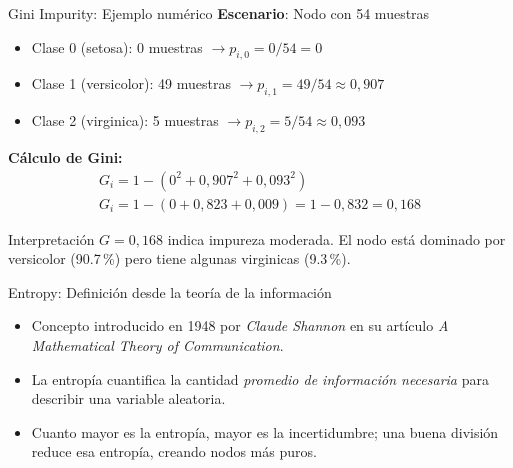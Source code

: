 \documentclass[aspectratio=169,12pt]{beamer}
\begin{document}
\begin{frame}{Gini Impurity: Ejemplo numérico}
  \textbf{Escenario}: Nodo con 54 muestras
  \begin{itemize}
    \item Clase 0 (setosa): 0 muestras $\rightarrow p_{i,0} = 0/54 = 0$
    \item Clase 1 (versicolor): 49 muestras $\rightarrow p_{i,1} = 49/54 \approx 0{,}907$
    \item Clase 2 (virginica): 5 muestras $\rightarrow p_{i,2} = 5/54 \approx 0{,}093$
  \end{itemize}
  \textbf{Cálculo de Gini:}
  \begin{gather*}
    G_i = 1 - (0^2 + 0{,}907^2 + 0{,}093^2)\\
    G_i = 1 - (0 + 0{,}823 + 0{,}009) = 1 - 0{,}832 = 0{,}168
  \end{gather*}
  \begin{block}{Interpretación}
    \small $G = 0{,}168$ indica impureza moderada. El nodo está dominado por versicolor (90.7\,\%) pero tiene algunas virginicas (9.3\,\%).
  \end{block}
\end{frame}

\begin{frame}{Entropy: Definición desde la teoría de la información}
  \begin{itemize}
    \item Concepto introducido en 1948 por \emph{Claude Shannon} en su artículo \emph{A Mathematical Theory of Communication}.
    \item La entropía cuantifica la cantidad \emph{promedio de información necesaria} para describir una variable aleatoria.
    \item Cuanto mayor es la entropía, mayor es la incertidumbre; una buena división reduce esa entropía, creando nodos más puros.
  \end{itemize}
\end{frame}
\end{document}

